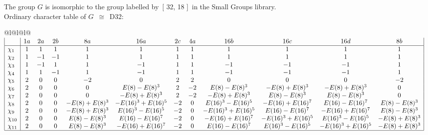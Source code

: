 \documentclass[varwidth=\maxdimen,border=10]{standalone}
\begin{document}
The group $G$ is isomorphic to the group labelled by\ [ 32, 18 ]\ in the Small Groups library.\\
Ordinary character table of $G$\ $\cong$\ D32:\\
\begin{center}
\begin{tabular}{@{}l@{}l@{}l@{}}
\hline
\(\begin{array}{|l|ccccccccccc|}
  & 1a & 2a & 2b & 8a & 16a & 2c & 4a & 16b & 16c & 16d & 8b\\ \hline
\chi_{1} & 1 & 1 & 1 & 1 & 1 & 1 & 1 & 1 & 1 & 1 & 1\\
\chi_{2} & 1 & -1 & -1 & 1 & 1 & 1 & 1 & 1 & 1 & 1 & 1\\
\chi_{3} & 1 & -1 & 1 & 1 & -1 & 1 & 1 & -1 & -1 & -1 & 1\\
\chi_{4} & 1 & 1 & -1 & 1 & -1 & 1 & 1 & -1 & -1 & -1 & 1\\
\chi_{5} & 2 & 0 & 0 & -2 & 0 & 2 & 2 & 0 & 0 & 0 & -2\\
\chi_{6} & 2 & 0 & 0 & 0 & E(8)-E(8)^{3} & 2 & -2 & E(8)-E(8)^{3} & -E(8)+E(8)^{3} & -E(8)+E(8)^{3} & 0\\
\chi_{7} & 2 & 0 & 0 & 0 & -E(8)+E(8)^{3} & 2 & -2 & -E(8)+E(8)^{3} & E(8)-E(8)^{3} & E(8)-E(8)^{3} & 0\\
\chi_{8} & 2 & 0 & 0 & -E(8)+E(8)^{3} & -E(16)^{3}+E(16)^{5} & -2 & 0 & E(16)^{3}-E(16)^{5} & -E(16)+E(16)^{7} & E(16)-E(16)^{7} & E(8)-E(8)^{3}\\
\chi_{9} & 2 & 0 & 0 & -E(8)+E(8)^{3} & E(16)^{3}-E(16)^{5} & -2 & 0 & -E(16)^{3}+E(16)^{5} & E(16)-E(16)^{7} & -E(16)+E(16)^{7} & E(8)-E(8)^{3}\\
\chi_{10} & 2 & 0 & 0 & E(8)-E(8)^{3} & E(16)-E(16)^{7} & -2 & 0 & -E(16)+E(16)^{7} & -E(16)^{3}+E(16)^{5} & E(16)^{3}-E(16)^{5} & -E(8)+E(8)^{3}\\
\chi_{11} & 2 & 0 & 0 & E(8)-E(8)^{3} & -E(16)+E(16)^{7} & -2 & 0 & E(16)-E(16)^{7} & E(16)^{3}-E(16)^{5} & -E(16)^{3}+E(16)^{5} & -E(8)+E(8)^{3}\\
\hline
\end{array}\)\\
\end{tabular}
\end{center}
\end{document}
